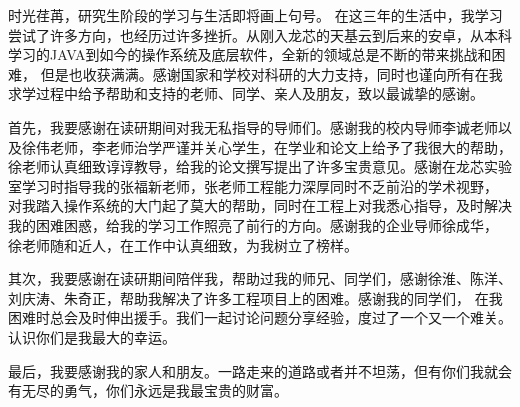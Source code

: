
\begin{acknowledgements}

时光荏苒，研究生阶段的学习与生活即将画上句号。
在这三年的生活中，我学习尝试了许多方向，也经历过许多挫折。从刚入龙芯的天基云到后来的安卓，从本科学习的JAVA到如今的操作系统及底层软件，全新的领域总是不断的带来挑战和困难，
但是也收获满满。感谢国家和学校对科研的大力支持，同时也谨向所有在我求学过程中给予帮助和支持的老师、同学、亲人及朋友，致以最诚挚的感谢。

首先，我要感谢在读研期间对我无私指导的导师们。感谢我的校内导师李诚老师以及徐伟老师，李老师治学严谨并关心学生，在学业和论文上给予了我很大的帮助，
徐老师认真细致谆谆教导，给我的论文撰写提出了许多宝贵意见。感谢在龙芯实验室学习时指导我的张福新老师，张老师工程能力深厚同时不乏前沿的学术视野，
对我踏入操作系统的大门起了莫大的帮助，同时在工程上对我悉心指导，及时解决我的困难困惑，给我的学习工作照亮了前行的方向。感谢我的企业导师徐成华，
徐老师随和近人，在工作中认真细致，为我树立了榜样。

其次，我要感谢在读研期间陪伴我，帮助过我的师兄、同学们，感谢徐淮、陈洋、刘庆涛、朱奇正，帮助我解决了许多工程项目上的困难。感谢我的同学们，
在我困难时总会及时伸出援手。我们一起讨论问题分享经验，度过了一个又一个难关。认识你们是我最大的幸运。

最后，我要感谢我的家人和朋友。一路走来的道路或者并不坦荡，但有你们我就会有无尽的勇气，你们永远是我最宝贵的财富。

\end{acknowledgements}

